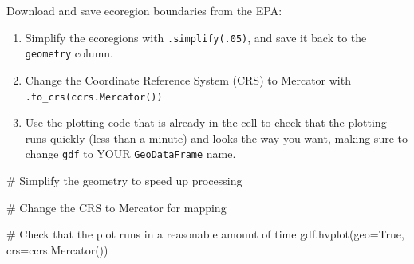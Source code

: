 \documentclass[
  letterpaper,
  DIV=11,
  numbers=noendperiod,
  oneside]{scrreprt}
\newenvironment{Shaded}{\begin{snugshade}}{\end{snugshade}}
\newcommand{\CommentTok}[1]{\textcolor[rgb]{0.37,0.37,0.37}{#1}}
\newcommand{\NormalTok}[1]{\textcolor[rgb]{0.00,0.23,0.31}{#1}}
\newcommand{\OperatorTok}[1]{\textcolor[rgb]{0.37,0.37,0.37}{#1}}
\newcommand{\VariableTok}[1]{\textcolor[rgb]{0.07,0.07,0.07}{#1}}
\providecommand{\tightlist}{%
  \setlength{\itemsep}{0pt}\setlength{\parskip}{0pt}}
\begin{document}
\begin{tcolorbox}[enhanced jigsaw, colbacktitle=quarto-callout-color!10!white, opacityback=0, bottomtitle=1mm, toptitle=1mm, bottomrule=.15mm, left=2mm, colframe=quarto-callout-color-frame, leftrule=.75mm, opacitybacktitle=0.6, colback=white, rightrule=.15mm, toprule=.15mm, breakable, titlerule=0mm, title=\textcolor{quarto-callout-color}{\faInfo}\hspace{0.5em}{Try It: Simplify ecoregion data}, coltitle=black, arc=.35mm]

Download and save ecoregion boundaries from the EPA:

\begin{enumerate}
\def\labelenumi{\arabic{enumi}.}
\tightlist
\item
  Simplify the ecoregions with \texttt{.simplify(.05)}, and save it back
  to the \texttt{geometry} column.
\item
  Change the Coordinate Reference System (CRS) to Mercator with
  \texttt{.to\_crs(ccrs.Mercator())}
\item
  Use the plotting code that is already in the cell to check that the
  plotting runs quickly (less than a minute) and looks the way you want,
  making sure to change \texttt{gdf} to YOUR \texttt{GeoDataFrame} name.
\end{enumerate}

\end{tcolorbox}

\begin{Shaded}
\begin{Highlighting}[]
\CommentTok{\# Simplify the geometry to speed up processing}

\CommentTok{\# Change the CRS to Mercator for mapping}

\CommentTok{\# Check that the plot runs in a reasonable amount of time}
\NormalTok{gdf.hvplot(geo}\OperatorTok{=}\VariableTok{True}\NormalTok{, crs}\OperatorTok{=}\NormalTok{ccrs.Mercator())}
\end{Highlighting}
\end{Shaded}
\end{document}
